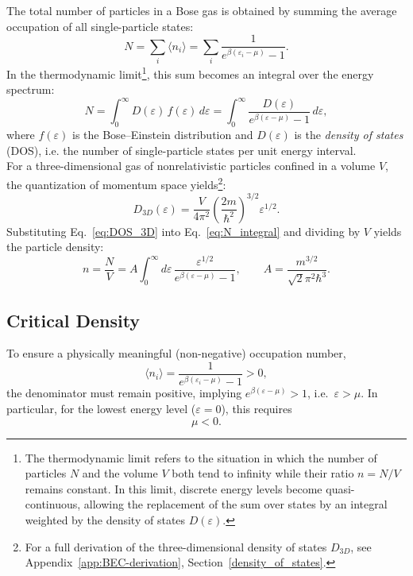 The total number of particles in a Bose gas is obtained by summing the average occupation of all single-particle states:
\begin{equation}
    N = \sum_i \langle n_i \rangle
      = \sum_i \frac{1}{e^{\beta(\varepsilon_i - \mu)} - 1}.
\end{equation}
In the thermodynamic limit\footnote{%
The thermodynamic limit refers to the situation in which the number of particles \(N\) and the volume \(V\) both tend to infinity while their ratio \(n = N/V\) remains constant.  
In this limit, discrete energy levels become quasi-continuous, allowing the replacement of the sum over states by an integral weighted by the density of states \(D(\varepsilon)\).%
}, this sum becomes an integral over the energy spectrum:
\begin{equation}
    N = \int_0^{\infty} D(\varepsilon)\, f(\varepsilon)\, d\varepsilon
      = \int_0^{\infty} \frac{D(\varepsilon)}{e^{\beta(\varepsilon - \mu)} - 1}\, d\varepsilon,
    \label{eq:N_integral}
\end{equation}
where \( f(\varepsilon) \) is the Bose–Einstein distribution and \( D(\varepsilon) \) is the \textit{density of states} (DOS), i.e. the number of single-particle states per unit energy interval.\\
For a three-dimensional gas of nonrelativistic particles confined in a volume \(V\), the quantization of momentum space yields\footnote{For a full derivation of the three-dimensional density of states \(D_{3D}\), see Appendix~\ref{app:BEC-derivation}, Section~\ref{density_of_states}.}:
\begin{equation}
    D_{3D}(\varepsilon) = \frac{V}{4\pi^2}
        \left(\frac{2m}{\hbar^2}\right)^{3/2} \varepsilon^{1/2}.
    \label{eq:DOS_3D}
\end{equation}
Substituting Eq.~\eqref{eq:DOS_3D} into Eq.~\eqref{eq:N_integral} and dividing by \(V\) yields the particle density:
\begin{equation}
\boxed{
    n = \frac{N}{V}
      = A \int_0^{\infty} d\varepsilon\, 
        \frac{\varepsilon^{1/2}}{e^{\beta(\varepsilon - \mu)} - 1},
    }
    \qquad
    A = \frac{m^{3/2}}{\sqrt{2}\pi^2\hbar^3}.
    \label{eq:n_integral_general}
\end{equation}

\subsection*{Critical Density}
To ensure a physically meaningful (non-negative) occupation number,
\[
\langle n_i \rangle = \frac{1}{e^{\beta(\varepsilon_i - \mu)} - 1} > 0,
\]
the denominator must remain positive, implying \( e^{\beta(\varepsilon - \mu)} > 1 \), i.e.\ \( \varepsilon > \mu \).  
In particular, for the lowest energy level (\(\varepsilon = 0\)), this requires
\[
\mu < 0.
\]

